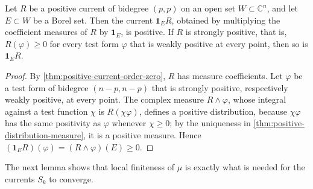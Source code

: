 \begin{lemma}\label{lem:positive-current-restriction}
Let $R$ be a positive current of bidegree $(p,p)$ on an open set $W\subset\mathbb C^n$, and let $E\subset W$ be a Borel set. Then the current $\mathbf1_ER$, obtained by multiplying the coefficient measures of $R$ by $\mathbf1_E$, is positive. If $R$ is strongly positive, that is, $R(\varphi)\geq0$ for every test form $\varphi$ that is weakly positive at every point, then so is $\mathbf1_ER$.
\end{lemma}
\begin{proof}
By \cref{thm:positive-current-order-zero}, $R$ has measure coefficients. Let $\varphi$ be a test form of bidegree $(n-p,n-p)$ that is strongly positive, respectively weakly positive, at every point. The complex measure $R\wedge\varphi$, whose integral against a test function $\chi$ is $R(\chi\varphi)$, defines a positive distribution, because $\chi\varphi$ has the same positivity as $\varphi$ whenever $\chi\geq0$; by the uniqueness in \cref{thm:positive-distribution-measure}, it is a positive measure. Hence $(\mathbf1_ER)(\varphi)=(R\wedge\varphi)(E)\geq0$.
\end{proof}

The next lemma shows that local finiteness of $\mu$ is exactly what is needed for the currents $S_k$ to converge.

